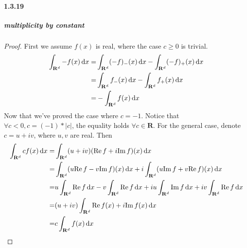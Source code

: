 \documentclass{article}
\begin{document}
\paragraph{1.3.19}
\subparagraph{multiplicity by constant}
\begin{proof}
First we assume $f(x)$ is real, where the case $c\geq 0$ is trivial. 
\[\begin{aligned}
\cit -f(x)\dx=&\cit (-f)_-(x)\dx-\cit(-f)_+(x)\dx\\
=&\cit f_-(x)\dx-\cit f_+(x)\dx\\
=&-\cit f(x)\dx
\end{aligned}\]
Now that we've proved the case where $c=-1$. Notice that $\forall c<0, c=(-1)*|c|$, the equality holds $\forall c\in\mathbf{R}$.
For the general case, denote $c=u+iv$, where $u,v$ are real. Then
\[\begin{aligned}
\cit cf(x)\dx=&\cit(u+iv)(\re f+i\im f)(x)\dx\\
=&\cit (u\re f-v\im f)(x)\dx+i\cit (u\im f+v\re f)(x)\dx\\
=&u\cit \re f\dx-v\cit \re f\dx +iu\cit \im f\dx+iv\cit \re f\dx\\
=&(u+iv)\cit \re f(x)+i\im f(x)\dx\\
=&c\cit f(x)\dx
\end{aligned}\]
\end{proof}
\end{document}

